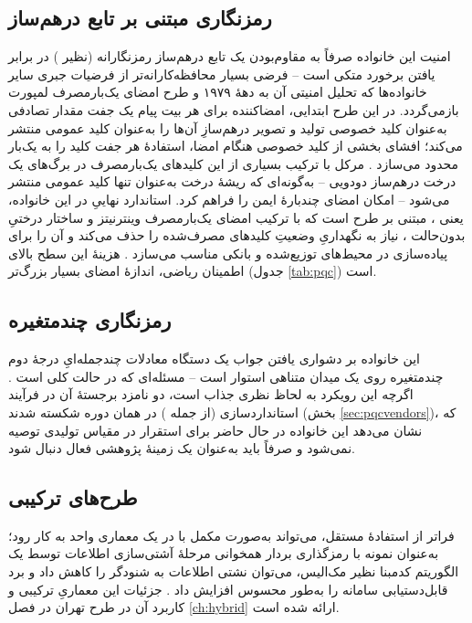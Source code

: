 \subsection{رمزنگاری مبتنی بر تابع درهم‌ساز }

امنیت این خانواده صرفاً به مقاوم‌بودن یک تابع درهم‌ساز رمزنگارانه (نظیر ) در برابر یافتن برخورد  متکی است -- فرضی بسیار محافظه‌کارانه‌تر از فرضیات جبری سایر خانواده‌ها که تحلیل امنیتی آن به دههٔ ۱۹۷۹ و طرح امضای یک‌بارمصرف لمپورت  بازمی‌گردد. در این طرح ابتدایی، امضاکننده برای هر بیت پیام یک جفت مقدار تصادفی به‌عنوان کلید خصوصی تولید و تصویر درهم‌سازِ آن‌ها را به‌عنوان کلید عمومی منتشر می‌کند؛ افشای بخشی از کلید خصوصی هنگام امضا، استفادهٔ هر جفت کلید را به یک‌بار محدود می‌سازد \Cite{djordjevic2025pqc}. مرکل  با ترکیب بسیاری از این کلیدهای یک‌بارمصرف در برگ‌های یک درخت درهم‌ساز دودویی -- به‌گونه‌ای که ریشهٔ درخت به‌عنوان تنها کلید عمومی منتشر می‌شود -- امکان امضای چندبارهٔ ایمن را فراهم کرد. استاندارد نهاییِ  در این خانواده، یعنی ، مبتنی بر طرح  است که با ترکیب امضای یک‌بارمصرف وینترنیتز  و ساختار درختیِ بدون‌حالت ، نیاز به نگهداریِ وضعیتِ کلیدهای مصرف‌شده را حذف می‌کند و آن را برای پیاده‌سازی در محیط‌های توزیع‌شده و بانکی مناسب می‌سازد \Cite{bernstein2015sphincs}. هزینهٔ این سطح بالای اطمینان ریاضی، اندازهٔ امضای بسیار بزرگ‌تر (جدول \ref{tab:pqc}) است.

\subsection{رمزنگاری چندمتغیره }

این خانواده بر دشواری یافتن جواب یک دستگاه معادلات چندجمله‌ایِ درجهٔ دوم چندمتغیره روی یک میدان متناهی استوار است -- مسئله‌ای که در حالت کلی  است \Cite{djordjevic2025pqc}. اگرچه این رویکرد به لحاظ نظری جذاب است، دو نامزد برجستهٔ آن در فرآیند استانداردسازی  (از جمله ) در همان دوره شکسته شدند (بخش \ref{sec:pqcvendors})، که نشان می‌دهد این خانواده در حال حاضر برای استقرار در مقیاس تولیدی توصیه نمی‌شود و صرفاً باید به‌عنوان یک زمینهٔ پژوهشی فعال دنبال شود.

\subsection{طرح‌های ترکیبی }

فراتر از استفادهٔ مستقل،  می‌تواند به‌صورت مکمل با  در یک معماری واحد به کار رود؛ به‌عنوان نمونه با رمزگذاری بردار همخوانی  مرحلهٔ آشتی‌سازی اطلاعات  توسط یک الگوریتم کدمبنا نظیر مک‌الیس، می‌توان نشتی اطلاعات به شنودگر را کاهش داد و برد قابل‌دستیابی سامانه را به‌طور محسوس افزایش داد \Cite{djordjevic2025pqc}. جزئیات این معماریِ ترکیبی و کاربرد آن در طرح تهران در فصل \ref{ch:hybrid} ارائه شده است.

